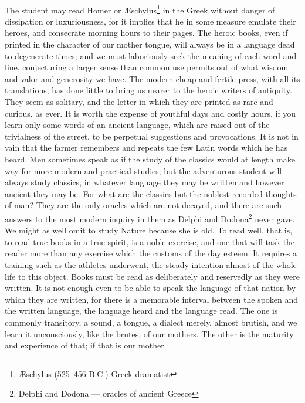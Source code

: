 \documentclass[letterpaper,12pt]{article}
\begin{document}
\paragraph{}
The student may read Homer or \AE{}schylus\footnote{\AE{}schylus (525--456 B.C.)
    Greek dramatist} in the Greek without danger of dissipation or
luxuriousness, for it implies that he in some measure emulate their heroes, and
consecrate morning hours to their pages. The heroic books, even if printed in
the character of our mother tongue, will always be in a language dead to
degenerate times; and we must laboriously seek the meaning of each word and
line, conjecturing a larger sense than common use permits out of what wisdom and
valor and generosity we have. The modern cheap and fertile press, with all its
translations, has done little to bring us nearer to the heroic writers of
antiquity. They seem as solitary, and the letter in which they are printed as
rare and curious, as ever. It is worth the expense of youthful days and costly
hours, if you learn only some words of an ancient language, which are raised out
of the trivialness of the street, to be perpetual suggestions and provocations.
It is not in vain that the farmer remembers and repeats the few Latin words
which he has heard. Men sometimes speak as if the study of the classics would at
length make way for more modern and practical studies; but the adventurous
student will always study classics, in whatever language they may be written and
however ancient they may be. For what are the classics but the noblest recorded
thoughts of man? They are the only oracles which are not decayed, and there are
such answers to the most modern inquiry in them as Delphi and
Dodona\footnote{Delphi and Dodona --- oracles of ancient Greece} never gave. We
might as well omit to study Nature because she is old. To read well, that is, to
read true books in a true spirit, is a noble exercise, and one that will task
the reader more than any exercise which the customs of the day esteem. It
requires a training such as the athletes underwent, the steady intention almost
of the whole life to this object. Books must be read as deliberately and
reservedly as they were written. It is not enough even to be able to speak the
language of that nation by which they are written, for there is a memorable
interval between the spoken and the written language, the language heard and the
language read. The one is commonly transitory, a sound, a tongue, a dialect
merely, almost brutish, and we learn it unconsciously, like the brutes, of our
mothers. The other is the maturity and experience of that; if that is our mother
\end{document}

